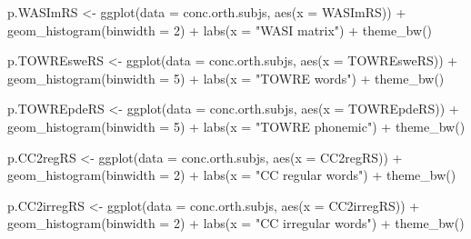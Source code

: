 \documentclass[
  letterpaper,
  DIV=11,
  numbers=noendperiod]{scrreprt}
\newenvironment{Shaded}{\begin{snugshade}}{\end{snugshade}}
\newcommand{\AttributeTok}[1]{\textcolor[rgb]{0.40,0.45,0.13}{#1}}
\newcommand{\DecValTok}[1]{\textcolor[rgb]{0.68,0.00,0.00}{#1}}
\newcommand{\FunctionTok}[1]{\textcolor[rgb]{0.28,0.35,0.67}{#1}}
\newcommand{\NormalTok}[1]{\textcolor[rgb]{0.00,0.23,0.31}{#1}}
\newcommand{\OtherTok}[1]{\textcolor[rgb]{0.00,0.23,0.31}{#1}}
\newcommand{\SpecialCharTok}[1]{\textcolor[rgb]{0.37,0.37,0.37}{#1}}
\newcommand{\StringTok}[1]{\textcolor[rgb]{0.13,0.47,0.30}{#1}}
\begin{document}
\begin{Shaded}
\begin{Highlighting}[numbers=left,,]
\NormalTok{p.WASImRS }\OtherTok{\textless{}{-}} \FunctionTok{ggplot}\NormalTok{(}\AttributeTok{data =}\NormalTok{ conc.orth.subjs, }\FunctionTok{aes}\NormalTok{(}\AttributeTok{x =}\NormalTok{ WASImRS)) }\SpecialCharTok{+}
  \FunctionTok{geom\_histogram}\NormalTok{(}\AttributeTok{binwidth =} \DecValTok{2}\NormalTok{) }\SpecialCharTok{+}
  \FunctionTok{labs}\NormalTok{(}\AttributeTok{x =} \StringTok{"WASI matrix"}\NormalTok{) }\SpecialCharTok{+}
  \FunctionTok{theme\_bw}\NormalTok{()}

\NormalTok{p.TOWREsweRS }\OtherTok{\textless{}{-}} \FunctionTok{ggplot}\NormalTok{(}\AttributeTok{data =}\NormalTok{ conc.orth.subjs, }\FunctionTok{aes}\NormalTok{(}\AttributeTok{x =}\NormalTok{ TOWREsweRS)) }\SpecialCharTok{+}
  \FunctionTok{geom\_histogram}\NormalTok{(}\AttributeTok{binwidth =} \DecValTok{5}\NormalTok{) }\SpecialCharTok{+}
  \FunctionTok{labs}\NormalTok{(}\AttributeTok{x =} \StringTok{"TOWRE words"}\NormalTok{) }\SpecialCharTok{+}
  \FunctionTok{theme\_bw}\NormalTok{()}

\NormalTok{p.TOWREpdeRS }\OtherTok{\textless{}{-}} \FunctionTok{ggplot}\NormalTok{(}\AttributeTok{data =}\NormalTok{ conc.orth.subjs, }\FunctionTok{aes}\NormalTok{(}\AttributeTok{x =}\NormalTok{ TOWREpdeRS)) }\SpecialCharTok{+}
  \FunctionTok{geom\_histogram}\NormalTok{(}\AttributeTok{binwidth =} \DecValTok{5}\NormalTok{) }\SpecialCharTok{+}
  \FunctionTok{labs}\NormalTok{(}\AttributeTok{x =} \StringTok{"TOWRE phonemic"}\NormalTok{) }\SpecialCharTok{+}
  \FunctionTok{theme\_bw}\NormalTok{()}

\NormalTok{p.CC2regRS }\OtherTok{\textless{}{-}} \FunctionTok{ggplot}\NormalTok{(}\AttributeTok{data =}\NormalTok{ conc.orth.subjs, }\FunctionTok{aes}\NormalTok{(}\AttributeTok{x =}\NormalTok{ CC2regRS)) }\SpecialCharTok{+}
  \FunctionTok{geom\_histogram}\NormalTok{(}\AttributeTok{binwidth =} \DecValTok{2}\NormalTok{) }\SpecialCharTok{+}
  \FunctionTok{labs}\NormalTok{(}\AttributeTok{x =} \StringTok{"CC regular words"}\NormalTok{) }\SpecialCharTok{+}
  \FunctionTok{theme\_bw}\NormalTok{()}

\NormalTok{p.CC2irregRS }\OtherTok{\textless{}{-}} \FunctionTok{ggplot}\NormalTok{(}\AttributeTok{data =}\NormalTok{ conc.orth.subjs, }\FunctionTok{aes}\NormalTok{(}\AttributeTok{x =}\NormalTok{ CC2irregRS)) }\SpecialCharTok{+}
  \FunctionTok{geom\_histogram}\NormalTok{(}\AttributeTok{binwidth =} \DecValTok{2}\NormalTok{) }\SpecialCharTok{+}
  \FunctionTok{labs}\NormalTok{(}\AttributeTok{x =} \StringTok{"CC irregular words"}\NormalTok{) }\SpecialCharTok{+}
  \FunctionTok{theme\_bw}\NormalTok{()}


\end{Highlighting}
\end{Shaded}
\end{document}
